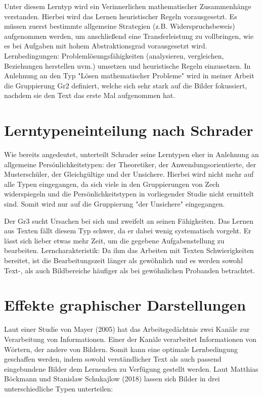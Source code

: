 Unter diesem Lerntyp wird ein Verinnerlichen mathematischer Zusammenhänge verstanden. Hierbei wird das Lernen heuristischer Regeln vorausgesetzt. Es müssen zuerst bestimmte allgemeine Strategien (z.B. Widerspruchsbeweis) aufgenommen werden, um anschließend eine Transferleistung zu vollbringen, wie es bei Aufgaben mit hohem Abstraktionsgrad vorausgesetzt wird. 
Lernbedingungen: Problemlösungsfähigkeiten (analysieren, vergleichen, Beziehungen herstellen uvm.) umsetzen und heuristische Regeln einzusetzen.
In Anlehnung an den Typ "Lösen mathematischer Probleme" wird in meiner Arbeit die Gruppierung \gls{Gr2} definiert, welche sich sehr stark auf die Bilder fokussiert, nachdem sie den Text das erste Mal aufgenommen hat\cite{zech1983grundkurs}.

\section{Lerntypeneinteilung nach Schrader}

Wie bereits angedeutet, unterteilt Schrader seine Lerntypen eher in Anlehnung an allgemeine Persönlichkeitstypen: der Theoretiker, der Anwendungsorientierte, der Musterschüler, der Gleichgültige und der Unsichere. Hierbei wird nicht mehr auf alle Typen eingegangen, da sich viele in den Gruppierungen von Zech widerspiegeln und die Persönlichkeitstypen in vorliegender Studie nicht ermittelt sind. Somit wird nur auf die Gruppierung "der Unsichere" eingegangen.

Der \gls{Gr3} sucht Ursachen bei sich und zweifelt an seinen Fähigkeiten. Das Lernen aus Texten fällt diesem Typ schwer, da er dabei wenig systematisch vorgeht. Er lässt sich lieber etwas mehr Zeit, um die gegebene Aufgabenstellung zu bearbeiten.
Lerncharakteristik: Da ihm das Arbeiten mit Texten Schwierigkeiten bereitet, ist die Bearbeitungszeit länger als gewöhnlich und es werden sowohl Text-, als auch Bildbereiche häufiger als bei gewöhnlichen Probanden betrachtet\cite{schrader2008lerntypen}. 

\section{Effekte graphischer Darstellungen}

Laut einer Studie von Mayer (2005) hat das Arbeitsgedächtnis zwei Kanäle zur Verarbeitung von Informationen. Einer der Kanäle verarbeitet Informationen von Wörtern, der andere von Bildern\cite{mayer2005reliability}. Somit kann eine optimale Lernbedingung geschaffen werden, indem sowohl verständlicher Text als auch passend eingebundene Bilder dem Lernenden zu Verfügung gestellt werden. Laut Matthias Böckmann und Stanislaw Schukajlow (2018) lassen sich Bilder in drei unterschiedliche Typen unterteilen:
    
